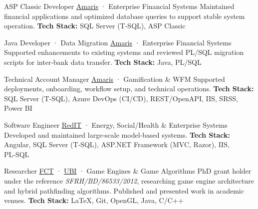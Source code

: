 \documentclass[
	a4paper,
]{fortysecondscv}
\begin{document}
\begin{cvtable}[3]
        {ASP Classic Developer}
        {\textcolor{cvsectioncolor}{\href{https://amaris.com/}{Amaris}} · Enterprise Financial Systems}
        {Maintained financial applications and optimized database queries to support stable system operation.
         \newline \textbf{Tech Stack:} 
         {\color{sklimegreen}SQL Server (T‑SQL)},
         {\color{skorange}ASP Classic}}

        {Java Developer · Data Migration}
        {\textcolor{cvsectioncolor}{\href{https://amaris.com/}{Amaris}} · Enterprise Financial Systems}
        {Supported enhancements to existing systems and reviewed PL/SQL migration scripts for inter‑bank data transfer.
         \newline \textbf{Tech Stack:} 
         {\color{skyellow}Java}, 
         {\color{skyellow}PL/SQL}}

        {Technical Account Manager}
        {\textcolor{cvsectioncolor}{\href{https://amaris.com/}{Amaris}} · Gamification \& WFM}
        {Supported deployments, onboarding, workflow setup, and technical operations.
         \newline \textbf{Tech Stack:} 
         {\color{sklimegreen}SQL Server (T‑SQL)}, 
         {\color{sklimegreen}Azure DevOps (CI/CD)}, 
         {\color{skyellow}REST/OpenAPI},
         {\color{skyellow}IIS}, 
         {\color{skyellow}SRSS, Power BI}}

        {Software Engineer}
        {\textcolor{cvsectioncolor}{\href{https://conkord.com/}{RedIT}} · Energy, Social/Health \& Enterprise Systems}
        {Developed and maintained large‑scale model‑based systems.
         \newline \textbf{Tech Stack:} 
         {\color{skgreen}Angular}, 
         {\color{sklimegreen}SQL Server (T‑SQL)}, 
         {\color{skyellow}ASP.NET Framework (MVC, Razor), IIS}, 
         {\color{skyellow}PL‑SQL}}

        {Researcher}
        {\textcolor{cvsectioncolor}{\href{https://www.fct.pt/}{FCT}} · \textcolor{cvsectioncolor}{\href{https://www.ubi.pt/}{UBI}} · Game Engines \& Game Algorithms}
        {PhD grant holder under the reference 
         \textit{SFRH/BD/86533/2012}, researching game engine architecture and hybrid pathfinding algorithms.
         Published and presented work in academic venues.
         \newline \textbf{Tech Stack:}
         {\color{sklimegreen}LaTeX},
         {\color{sklimegreen}Git},
         {\color{skyellow}OpenGL},
         {\color{skyellow}Java},
         {\color{skorange}C/C++}}    


\end{cvtable}
\end{document}
